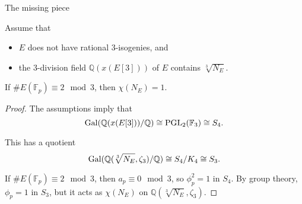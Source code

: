 \documentclass[10pt]{beamer}
\begin{document}
\begin{frame}[t]{The missing piece}

\begin{theorem}[A.--Dokchitser]
Assume that
\begin{itemize}
\item $ E $ does not have rational $ 3 $-isogenies, and
\item the $ 3 $-division field $ \mathbb{Q}(x(E[3])) $ of $ E $ contains $ \sqrt[3]{N_E} $.
\end{itemize}
If $ \#E(\mathbb{F}_p) \equiv 2 \mod 3 $, then $ \chi(N_E) = 1 $.
\end{theorem}

\pause

\begin{proof}
The assumptions imply that
\vspace{-0.2cm} $$ \vspace{-0.2cm} \mathrm{Gal}(\mathbb{Q}(x(E[3])) / \mathbb{Q}) \cong \mathrm{PGL}_2(\mathbb{F}_3) \cong S_4. $$

\pause

This has a quotient
\vspace{-0.2cm} $$ \vspace{-0.2cm} \mathrm{Gal}(\mathbb{Q}(\sqrt[3]{N_E}, \zeta_3) / \mathbb{Q}) \cong S_4 / K_4 \cong S_3. $$

\pause

If $ \#E(\mathbb{F}_p) \equiv 2 \mod 3 $, then $ a_p \equiv 0 \mod 3 $, so $ \phi_p^2 = 1 $ in $ S_4 $. \pause By group theory, $ \phi_p = 1 $ in $ S_3 $, but it acts as $ \chi(N_E) $ on $ \mathbb{Q}(\sqrt[3]{N_E}, \zeta_3) $.
\end{proof}

\end{frame}
\end{document}

